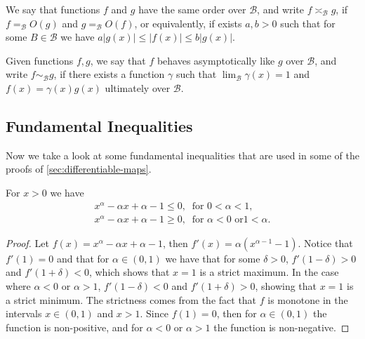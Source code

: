 \begin{definition}\label{def: asymp-order}
We say that functions \(f\) and \(g\) have the same order over \(\mathcal
B\), and write \(f \asymp_{\mathcal B} g\), if \(f =_{\mathcal B} O(g)\) and
\(g =_{\mathcal B} O(f)\), or equivalently, if exists \(a, b > 0\) such that
for some \(B \in \mathcal B\) we have \(a |g(x)| \leq |f(x)| \leq b|g(x)|\).
\end{definition}

\begin{definition}
Given functions \(f, g\), we say that \(f\) behaves asymptotically like \(g\)
over \(\mathcal B\), and write \(f \sim_{\mathcal B} g\), if there exists a
function \(\gamma\) such that \(\lim_{\mathcal B} \gamma(x) = 1\) and \(f(x) =
\gamma(x) g(x)\) ultimately over \(\mathcal B\).
\end{definition}

\subsection{Fundamental Inequalities}

Now we take a look at some fundamental inequalities that are used in some of the
proofs of \cref{sec:differentiable-maps}.

\begin{lemma}\label{lem: CI}
For \(x > 0\) we have
\begin{gather}
\label{eq: CI-1}
x^\alpha - \alpha x + \alpha - 1 \leq 0,\ \text{ for } 0 < \alpha < 1, \\
\label{eq: CI-2}
x^\alpha - \alpha x + \alpha - 1 \geq 0,\ \text{ for } \alpha < 0 \text{ or
} 1 < \alpha.
\end{gather}
\end{lemma}

\begin{proof}
Let \(f(x) = x^\alpha - \alpha x + \alpha - 1\), then \(f'(x) =
\alpha(x^{\alpha - 1} - 1)\). Notice that \(f'(1) = 0\) and that for \(\alpha
\in (0, 1)\) we have that for some \(\delta > 0\), \(f'(1 - \delta) > 0\) and
\(f'(1 + \delta) < 0\), which shows that \(x = 1\) is a strict maximum. In the
case where \(\alpha < 0\) or \(\alpha > 1\), \(f'(1 - \delta) < 0\) and \(f'(1
+ \delta) > 0\), showing that \(x = 1\) is a strict minimum. The strictness
comes from the fact that \(f\) is monotone in the intervals \(x \in (0, 1)\)
and \(x > 1\). Since \(f(1) = 0\), then for \(\alpha \in (0, 1)\) the function
is non-positive, and for \(\alpha < 0\) or \(\alpha > 1\) the function is
non-negative.
\end{proof}

